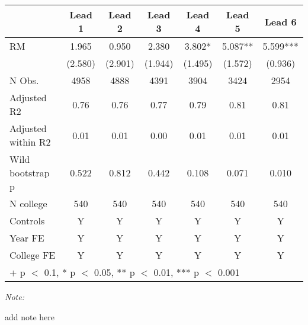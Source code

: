 \begin{table}
\centering
\begin{threeparttable}
\begin{tabular}[t]{lcccccc}
\toprule
  & Lead 1 & Lead 2 & Lead 3 & Lead 4 & Lead 5 & Lead 6\\
\midrule
RM & \num{1.965} & \num{0.950} & \num{2.380} & \num{3.802}* & \num{5.087}** & \num{5.599}***\\
 & (\num{2.580}) & (\num{2.901}) & (\num{1.944}) & (\num{1.495}) & (\num{1.572}) & (\num{0.936})\\
\midrule
N Obs. & \num{4958} & \num{4888} & \num{4391} & \num{3904} & \num{3424} & \num{2954}\\
Adjusted R2 & \num{0.76} & \num{0.76} & \num{0.77} & \num{0.79} & \num{0.81} & \num{0.81}\\
Adjusted within R2 & \num{0.01} & \num{0.01} & \num{0.00} & \num{0.01} & \num{0.01} & \num{0.01}\\
Wild bootstrap p & 0.522 & 0.812 & 0.442 & 0.108 & 0.071 & 0.010\\
N college & 540 & 540 & 540 & 540 & 540 & 540\\
Controls & Y & Y & Y & Y & Y & Y\\
Year FE & Y & Y & Y & Y & Y & Y\\
College FE & Y & Y & Y & Y & Y & Y\\
\bottomrule
\multicolumn{7}{l}{\rule{0pt}{1em}+ p $<$ 0.1, * p $<$ 0.05, ** p $<$ 0.01, *** p $<$ 0.001}\\
\end{tabular}
\begin{tablenotes}
\item \textit{Note: } 
\item add note here
\end{tablenotes}
\end{threeparttable}
\end{table}
